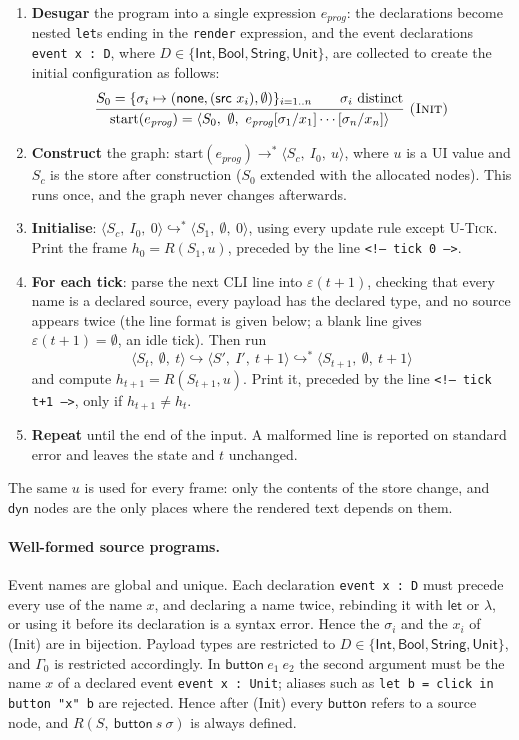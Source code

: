 \documentclass{article}
\makeatletter
\newcommand{\kw}[1]{\mathsf{#1}}
\newcommand{\none}{\kw{none}}
\newcommand{\cfg}[3]{\langle #1,\ #2,\ #3\rangle}
\newcommand{\step}{\longrightarrow}
\newcommand{\ustep}{\hookrightarrow}
\newcommand{\ustar}{\hookrightarrow^{*}}
\newcommand{\rul}[3]{\[\dfrac{\begin{array}{@{}c@{}}#2\end{array}}{\begin{array}{@{}c@{}}#3\end{array}}\ \textsc{#1}\]}
\makeatother
\begin{document}
\begin{enumerate}
  \item \textbf{Desugar} the program into a single expression $e_{\mathit{prog}}$: the declarations become nested \texttt{let}s ending in the \texttt{render} expression, and the event declarations \texttt{event x : D}, where $D \in \{\kw{Int},\kw{Bool},\kw{String},\kw{Unit}\}$, are collected to create the initial configuration as follows:
\rul{(Init)}{S_0 = \{\sigma_i \mapsto (\none,(\kw{src}\ x_i),\emptyset)\}_{i=1..n} \qquad \sigma_i \text{ distinct}}
{\mathrm{start}(e_{\mathit{prog}}) = \cfg{S_0}{\emptyset}{e_{\mathit{prog}}[\sigma_1/x_1]\cdots[\sigma_n/x_n]}}
  \item \textbf{Construct} the graph: $\mathrm{start}(e_{\mathit{prog}}) \step^{*} \cfg{S_c}{I_0}{u}$, where $u$ is a UI value and $S_c$ is the store after construction ($S_0$ extended with the allocated nodes). This runs once, and the graph never changes afterwards.
  \item \textbf{Initialise}: $\cfg{S_c}{I_0}{0} \ustar \cfg{S_1}{\emptyset}{0}$, using every update rule except \textsc{U-Tick}. Print the frame $h_0 = R(S_1,u)$, preceded by the line \texttt{\textless!-- tick 0 --\textgreater}.
  \item \textbf{For each tick}: parse the next CLI line into $\varepsilon(t+1)$, checking that every name is a declared source, every payload has the declared type, and no source appears twice (the line format is given below; a blank line gives $\varepsilon(t+1) = \emptyset$, an idle tick). Then run
  \[\cfg{S_t}{\emptyset}{t} \ustep \cfg{S'}{I'}{t+1} \ustar \cfg{S_{t+1}}{\emptyset}{t+1}\]
    and compute $h_{t+1} = R(S_{t+1},u)$. Print it, preceded by the line \texttt{\textless!-- tick t+1 --\textgreater}, only if $h_{t+1} \neq h_t$.
  \item \textbf{Repeat} until the end of the input. A malformed line is reported on standard error and leaves the state and $ t $ unchanged.
\end{enumerate}
The same $u$ is used for every frame: only the contents of the store change, and $\kw{dyn}$ nodes are the only places where the rendered text depends on them.

\paragraph{Well-formed source programs.} Event names are global and unique. Each declaration \texttt{event x : D} must precede every use of the name $x$, and declaring a name twice, rebinding it with $\kw{let}$ or $\lambda$, or using it before its declaration is a syntax error. Hence the $\sigma_i$ and the $x_i$ of (Init) are in bijection. Payload types are restricted to $D \in \{\kw{Int},\kw{Bool},\kw{String},\kw{Unit}\}$, and $\Gamma_0$ is restricted accordingly. In $\kw{button}\ e_1\ e_2$ the second argument must be the name $x$ of a declared event \texttt{event x : Unit}; aliases such as \texttt{let b = click in button "x" b} are rejected. Hence after (Init) every $\kw{button}$ refers to a source node, and $R(S,\ \kw{button}\ s\ \sigma)$ is always defined.
\end{document}
